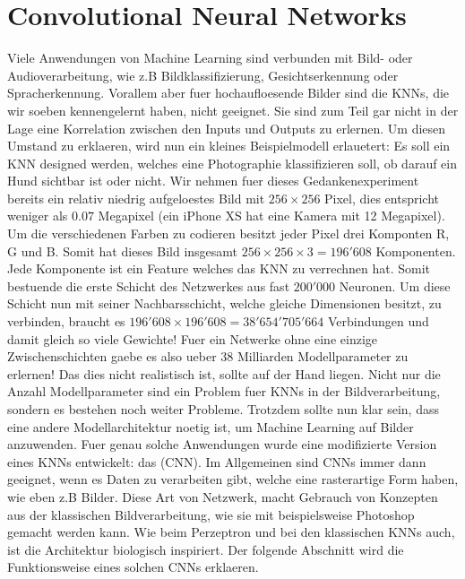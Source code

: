 \chapter{Convolutional Neural Networks}
Viele Anwendungen von Machine Learning sind verbunden mit Bild- oder
Audioverarbeitung, wie z.B Bildklassifizierung, Gesichtserkennung oder
Spracherkennung.
Vorallem aber fuer hochaufloesende Bilder sind die KNNs, die wir soeben
kennengelernt haben, nicht geeignet. Sie sind zum Teil gar nicht in der
Lage eine Korrelation zwischen den Inputs und Outputs zu erlernen.
Um diesen Umstand zu erklaeren, wird nun ein kleines Beispielmodell erlauetert:
\para{}
\label{sec:CNN_parameter_problem}
Es soll ein KNN designed werden, welches eine Photographie klassifizieren
soll, ob darauf ein Hund sichtbar ist oder nicht. Wir nehmen fuer dieses
Gedankenexperiment bereits ein relativ niedrig aufgeloestes Bild mit $256 \times 256$
Pixel, dies entspricht weniger als $0.07$ Megapixel (ein iPhone XS hat eine Kamera mit
12 Megapixel). Um die verschiedenen Farben zu codieren besitzt jeder Pixel drei Komponten R, G
und B. Somit hat dieses Bild insgesamt $256 \times 256 \times 3 = 196'608$
Komponenten. Jede Komponente ist ein Feature welches das KNN zu verrechnen hat. Somit bestuende
die erste Schicht des Netzwerkes aus fast $200'000$ Neuronen. Um diese Schicht
nun mit seiner Nachbarsschicht, welche gleiche Dimensionen besitzt, zu verbinden, braucht
es $196'608 \times 196'608 = 38'654'705'664$ Verbindungen und damit gleich so
viele Gewichte! Fuer ein Netwerke ohne eine einzige Zwischenschichten gaebe es
also ueber 38 Milliarden Modellparameter zu erlernen! Das dies nicht realistisch ist,
sollte auf der Hand liegen.
\para{}
Nicht nur die Anzahl Modellparameter sind ein Problem fuer KNNs in der
Bildverarbeitung, sondern es bestehen noch weiter Probleme.
Trotzdem sollte nun klar sein, dass eine andere Modellarchitektur noetig ist, um Machine
Learning auf Bilder anzuwenden. Fuer genau solche Anwendungen wurde eine modifizierte
Version eines KNNs entwickelt: das  (CNN).
Im Allgemeinen sind CNNs immer dann geeignet, wenn es Daten zu verarbeiten gibt, welche eine
rasterartige Form haben, wie eben z.B Bilder.
Diese Art von Netzwerk, macht Gebrauch von Konzepten aus der klassischen
Bildverarbeitung, wie sie mit beispielsweise Photoshop gemacht werden kann.
Wie beim Perzeptron und bei den klassischen KNNs auch, ist die Architektur
biologisch inspiriert.
Der folgende Abschnitt wird die Funktionsweise eines solchen CNNs erklaeren.
\para{}
\cite{Goodfellow-et-al-2016}
\cite{deeplearning.ai:cnn}
\cite{wiki:cnn}

